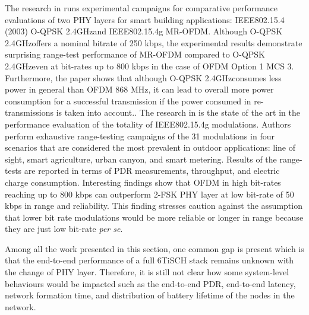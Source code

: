 \documentclass[journal]{IEEEtran}
\newcommand{\oqpsk}        {O-QPSK 2.4GHz}
\newcommand{\ofdm}         {OFDM 868 MHz}
\begin{document}
The research in \cite{munoz18overview} runs experimental campaigns for comparative performance evaluations of two PHY layers for smart building applications: IEEE802.15.4 (2003) \oqpsk and IEEE802.15.4g MR-OFDM. 
Although \oqpsk offers a nominal bitrate of 250 kbps, the experimental results demonstrate surprising range-test performance of MR-OFDM compared to \oqpsk even at bit-rates up to 800 kbps in the case of OFDM Option 1 MCS 3. 
Furthermore, the paper shows that although \oqpsk consumes less power in general than \ofdm, it can lead to overall more power consumption for a successful transmission if the power consumed in re-transmissions is taken into account..  
The research in \cite{munoz18evaluationa} is the state of the art in the performance evaluation of the totality of IEEE802.15.4g modulations.
Authors perform exhaustive  range-testing campaigns of the 31 modulations in four scenarios that are considered the most prevalent in outdoor applications: line of sight, smart agriculture, urban canyon, and smart metering. 
Results of the range-tests are reported in terms of PDR measurements, throughput, and electric charge consumption.
Interesting findings show that OFDM in high bit-rates reaching up to 800 kbps can outperform 2-FSK PHY layer at low bit-rate of 50 kbps in range and reliability. 
This finding stresses caution against the assumption that lower bit rate modulations would be more reliable or longer in range because they are just low bit-rate \textit{per se}. 

Among all the work presented in this section, one common gap is present which is that the end-to-end performance of a full 6TiSCH stack remains unknown with the change of PHY layer. 
Therefore, it is still not clear how some system-level behaviours would be impacted such as the end-to-end  PDR, end-to-end latency, network formation time, and distribution of battery lifetime of the nodes in the network.  

\end{document}
